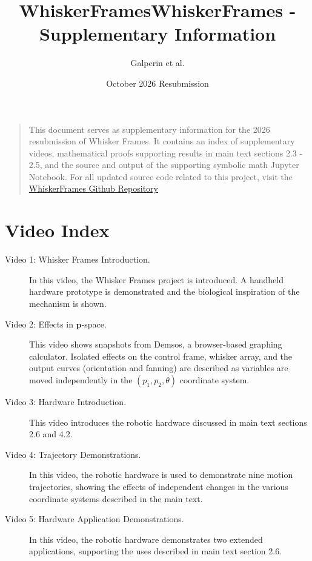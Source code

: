 \documentclass[11pt]{article}
\title{WhiskerFrames}
\title{WhiskerFrames - Supplementary Information}
\author{Galperin et al.}
\date{October 2026 Resubmission}
\newcommand{\bs}[1]{\boldsymbol{#1}} %
\begin{document}
\maketitle



\begin{quotation}
    This document serves as supplementary information for the 2026 resubmission of Whisker Frames.
    It contains an index of supplementary videos, mathematical proofs supporting results in main text sections 2.3 - 2.5, and the source and output of the supporting symbolic math Jupyter Notebook. 
    For all updated source code related to this project, visit the \href{https://github.com/SeNSE-lab/WhiskerFrames}{WhiskerFrames Github Repository}
\end{quotation}


\tableofcontents
\newpage

\section{Video Index}
    \begin{description}
      \item [Video 1: Whisker Frames Introduction.]
      In this video, the Whisker Frames project is introduced. A handheld hardware prototype is demonstrated and the biological inspiration of the mechanism is shown. 
      
      \item [Video 2: Effects in $\bs{p}$-space.] 
      This video shows snapshots from Demsos, a browser-based graphing calculator. Isolated effects on the control frame, whisker array, and the output curves (orientation and fanning) are described as variables are moved independently in the $(p_1,p_2,\theta)$ coordinate system.
      
      \item [Video 3: Hardware Introduction.] 
      This video introduces the robotic hardware discussed in main text sections 2.6 and 4.2. 
      
      \item [Video 4: Trajectory Demonstrations.] 
      In this video, the robotic hardware is used to demonstrate nine motion trajectories, showing the effects of independent changes in the various coordinate systems described in the main text.
      
      \item [Video 5: Hardware Application Demonstrations.] 
      In this video, the robotic hardware demonstrates two extended applications, supporting the uses described in main text section 2.6. 
    \end{description}  
\end{document}
